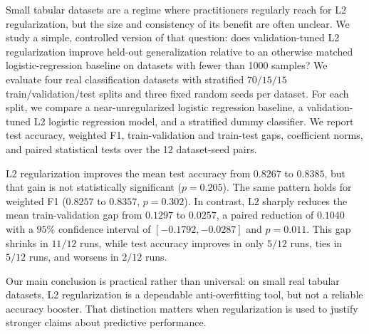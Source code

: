 Small tabular datasets are a regime where practitioners regularly reach for L2 regularization, but the size and consistency of its benefit are often unclear. We study a simple, controlled version of that question: does validation-tuned L2 regularization improve held-out generalization relative to an otherwise matched logistic-regression baseline on datasets with fewer than 1000 samples? We evaluate four real classification datasets with stratified $70/15/15$ train/validation/test splits and three fixed random seeds per dataset. For each split, we compare a near-unregularized logistic regression baseline, a validation-tuned L2 logistic regression model, and a stratified dummy classifier. We report test accuracy, weighted F1, train-validation and train-test gaps, coefficient norms, and paired statistical tests over the 12 dataset-seed pairs.

L2 regularization improves the mean test accuracy from $0.8267$ to $0.8385$, but that gain is not statistically significant ($p=0.205$). The same pattern holds for weighted F1 ($0.8257$ to $0.8357$, $p=0.302$). In contrast, L2 sharply reduces the mean train-validation gap from $0.1297$ to $0.0257$, a paired reduction of $0.1040$ with a $95\%$ confidence interval of $[-0.1792,-0.0287]$ and $p=0.011$. This gap shrinks in $11/12$ runs, while test accuracy improves in only $5/12$ runs, ties in $5/12$ runs, and worsens in $2/12$ runs.

Our main conclusion is practical rather than universal: on small real tabular datasets, L2 regularization is a dependable anti-overfitting tool, but not a reliable accuracy booster. That distinction matters when regularization is used to justify stronger claims about predictive performance.
